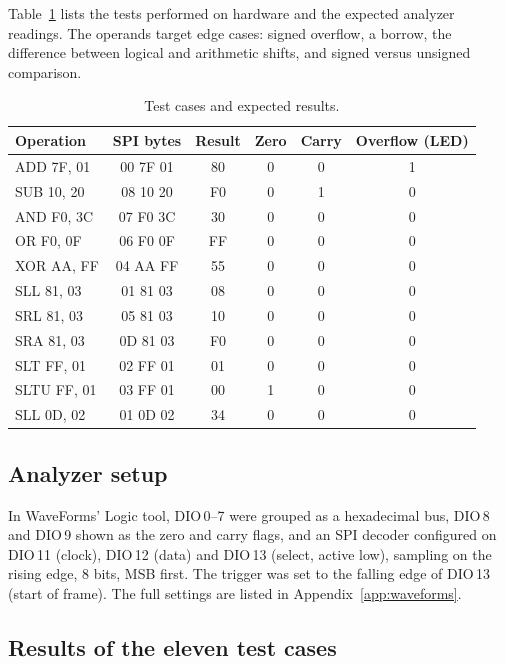 \documentclass[12pt,a4paper,twoside]{article}
\begin{document}
Table~\ref{tab:vectors} lists the tests performed on hardware and
the expected analyzer readings. The operands target edge cases: signed overflow, a
borrow, the difference between logical and arithmetic shifts, and signed versus
unsigned comparison.

\begin{table}[H]
\centering
\caption{Test cases and expected results.}
\label{tab:vectors}
\begin{tabular}{@{}lccccc@{}}
\toprule
\textbf{Operation} & \textbf{SPI bytes} & \textbf{Result} & \textbf{Zero} &
\textbf{Carry} & \textbf{Overflow (LED)} \\
\midrule
ADD 7F, 01  & 00 7F 01 & 80 & 0 & 0 & 1 \\
SUB 10, 20  & 08 10 20 & F0 & 0 & 1 & 0 \\
AND F0, 3C  & 07 F0 3C & 30 & 0 & 0 & 0 \\
OR F0, 0F   & 06 F0 0F & FF & 0 & 0 & 0 \\
XOR AA, FF  & 04 AA FF & 55 & 0 & 0 & 0 \\
SLL 81, 03  & 01 81 03 & 08 & 0 & 0 & 0 \\
SRL 81, 03  & 05 81 03 & 10 & 0 & 0 & 0 \\
SRA 81, 03  & 0D 81 03 & F0 & 0 & 0 & 0 \\
SLT FF, 01  & 02 FF 01 & 01 & 0 & 0 & 0 \\
SLTU FF, 01 & 03 FF 01 & 00 & 1 & 0 & 0 \\
SLL 0D, 02  & 01 0D 02 & 34 & 0 & 0 & 0 \\
\bottomrule
\end{tabular}
\end{table}

\subsection{Analyzer setup}

In WaveForms' Logic tool, DIO\,0--7 were grouped as a hexadecimal bus, DIO\,8 and
DIO\,9 shown as the zero and carry flags, and an SPI decoder configured on DIO\,11
(clock), DIO\,12 (data) and DIO\,13 (select, active low), sampling on the rising
edge, 8 bits, MSB first. The trigger was set to the falling edge of DIO\,13 (start
of frame). The full settings are listed in Appendix~\ref{app:waveforms}.

\subsection{Results of the eleven test cases}
\end{document}
